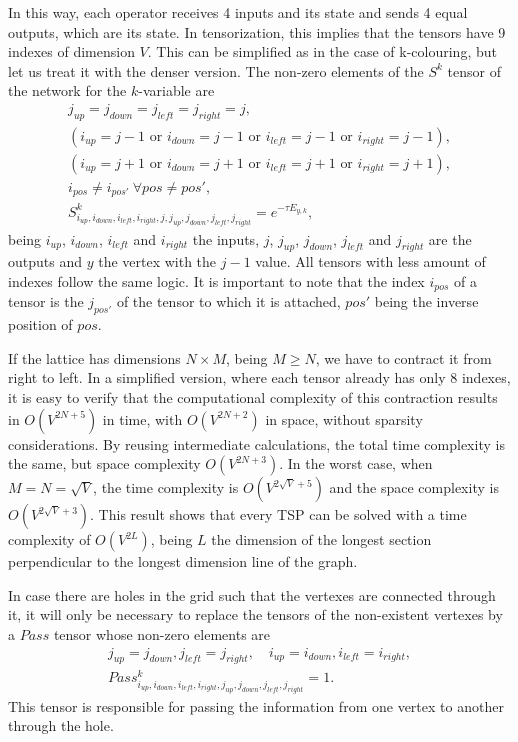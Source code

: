 In this way, each operator receives 4 inputs and its state and sends 4 equal outputs, which are its state. In tensorization, this implies that the tensors have 9 indexes of dimension $V$. This can be simplified as in the case of k-colouring, but let us treat it with the denser version. The non-zero elements of the $S^k$ tensor of the network for the $k$-variable are
\begin{equation}
     \begin{gathered}
        j_{up}=j_{down}=j_{left}=j_{right}=j,\\
        (i_{up} = j-1 \text{ or } i_{down} = j-1 \text{ or } i_{left} = j-1 \text{ or } i_{right}= j-1),\\
        (i_{up} = j+1 \text{ or } i_{down} = j+1 \text{ or } i_{left} = j+1 \text{ or } i_{right}= j+1),\\
        i_{pos} \neq i_{pos'}\ \forall pos\neq pos',\\
        S^k_{i_{up},i_{down},i_{left},i_{right},j,j_{up},j_{down},j_{left},j_{right}} = e^{-\tau E_{y,k}},
     \end{gathered}
\end{equation}
being $i_{up}$, $i_{down}$, $i_{left}$ and $i_{right}$ the inputs, $j$, $j_{up}$, $j_{down}$, $j_{left}$ and $j_{right}$ are the outputs and $y$ the vertex with the $j-1$ value. All tensors with less amount of indexes follow the same logic. It is important to note that the index $i_{pos}$ of a tensor is the $j_{pos'}$ of the tensor to which it is attached, $pos'$ being the inverse position of $pos$.

If the lattice has dimensions $N\times M$, being $M\geq N$, we have to contract it from right to left. In a simplified version, where each tensor already has only 8 indexes, it is easy to verify that the computational complexity of this contraction results in $O(V^{2N+5})$ in time, with $O(V^{2N+2})$ in space, without sparsity considerations. By reusing intermediate calculations, the total time complexity is the same, but space complexity $O(V^{2N+3})$. In the worst case, when $M=N=\sqrt{V}$, the time complexity is $O(V^{2\sqrt{V}+5})$ and the space complexity is $O(V^{2\sqrt{V}+3})$. This result shows that every TSP can be solved with a time complexity of $O(V^{2L})$, being $L$ the dimension of the longest section perpendicular to the longest dimension line of the graph.

In case there are holes in the grid such that the vertexes are connected through it, it will only be necessary to replace the tensors of the non-existent vertexes by a $Pass$ tensor whose non-zero elements are
\begin{equation}
     \begin{gathered}
        j_{up}=j_{down}, j_{left}=j_{right},\quad i_{up}=i_{down}, i_{left}=i_{right},\\
        Pass^k_{i_{up},i_{down},i_{left},i_{right},j_{up},j_{down},j_{left},j_{right}} = 1.
     \end{gathered}
\end{equation}
This tensor is responsible for passing the information from one vertex to another through the hole.

